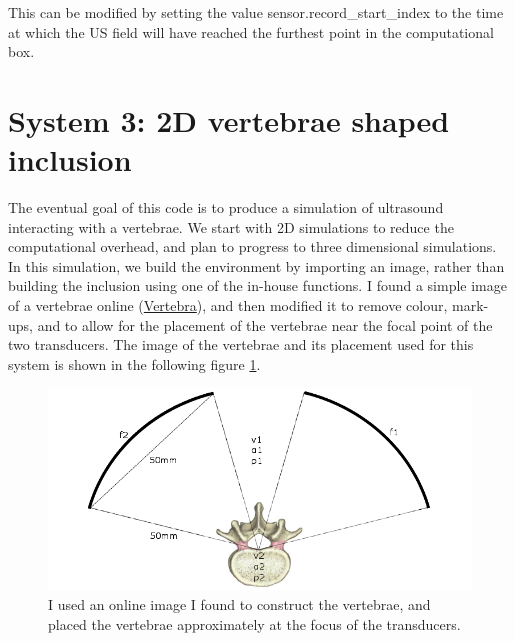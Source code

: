 \documentclass[10pt,a4paper]{article}
\begin{document}
This can be modified by setting the value sensor.record\_start\_index to the time at which the US field will have reached the furthest point in the computational box. 


\section{System 3: 2D vertebrae shaped inclusion}

The eventual goal of this code is to produce a simulation of ultrasound interacting with a vertebrae. We start with 2D simulations to reduce the computational overhead, and plan to progress to three dimensional simulations. In this simulation, we build the environment by importing an image, rather than building the inclusion using one of the in-house functions. I found a simple image of a vertebrae online (\href{https://www.cedars-sinai.edu/Patients/Programs-and-Services/Spine-Center/The-Patient-Guide/Anatomy-of-the-Spine/Vertebrae-of-the-Spine.aspx}{Vertebra}), and then modified it to remove colour, mark-ups, and to allow for the placement of the vertebrae near the focal point of the two transducers. The image of the vertebrae and its placement used for this system is shown in the following figure \ref{vertebra}.

\begin{figure}[H]\label{vertebra}
\centering
\includegraphics[scale=0.5]{setup3}
\caption{I used an online image I found to construct the vertebrae, and placed the vertebrae approximately at the focus of the transducers.}
\end{figure}
\end{document}
